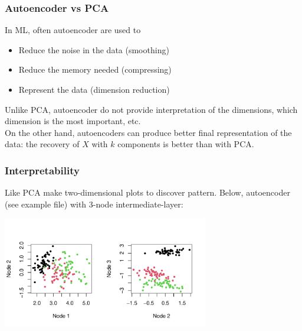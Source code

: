 \begin{frame}
\frametitle{Autoencoder vs PCA}
In ML, often autoencoder are used to 
\begin{itemize}
\item Reduce the noise in the data (smoothing)
\item Reduce the memory needed (compressing)
\item Represent the data (dimension reduction)
\end{itemize}
Unlike PCA, autoencoder do not provide interpretation of the dimensions, which dimension is the most important, etc.\\
\vspace{0.3cm}
On the other hand, autoencoders can produce better final representation of the data: the recovery of $X$ with $k$ components is better than with PCA.
\end{frame}
\begin{frame}
\frametitle{Interpretability}
Like PCA make two-dimensional plots to discover pattern. Below, autoencoder (see example file) with 3-node intermediate-layer:
\begin{center}
\includegraphics[width=9cm]{../../Graphs/Iris_AE_embed.png}
\end{center}
\end{frame}
